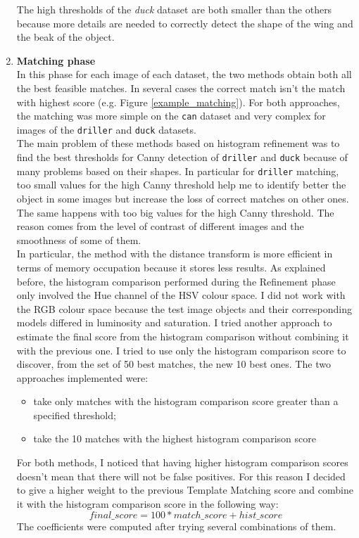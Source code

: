 \documentclass{article}
\begin{document}
\begin{enumerate}
{The high thresholds of the \textit{duck} dataset are both smaller than the others  because more details are needed to correctly detect the shape of the wing and the beak of the object.
}
\item{\textbf{Matching phase}\\
In this phase for each image of each dataset, the two methods obtain both all the best feasible matches. In several cases the correct match isn't the match with highest score (e.g. Figure \ref{example_matching}). For both approaches, the matching was more simple on the \texttt{can} dataset and very complex for images of the \texttt{driller} and \texttt{duck} datasets.\\
The main problem of these methods based on histogram refinement was to find the best thresholds for Canny detection of \texttt{driller} and \texttt{duck} because of many problems based on their shapes. In particular for \texttt{driller} matching, too small values for the high Canny threshold help me to identify better the object in some images but increase the loss of correct matches on other ones. The same happens with too big values for the high Canny threshold. The reason comes from the level of contrast of different images and the smoothness of some of them.\\
In particular, the method with the distance transform is more efficient in terms of memory occupation because it stores less results.
As explained before, the histogram comparison performed during the Refinement phase only involved the Hue channel of the HSV colour space. I did not work with the RGB colour space because the test image objects and their corresponding models differed in luminosity and saturation. I tried another approach to estimate the final score from the histogram comparison without combining it with the previous one. I tried to use only the histogram comparison score to discover, from the set of 50 best matches, the new 10 best ones. The two approaches implemented were: 
\begin{itemize}
\item{take only matches with the histogram comparison score greater than a specified threshold;}
\item{take the 10 matches with the highest histogram comparison score}
\end{itemize}
For both methods, I noticed that having higher histogram comparison scores doesn't mean that there will not be false positives. For this reason I decided to give a higher weight to the previous Template Matching score and combine it with the histogram comparison score in the following way:
$$final\_score=100*match\_score + hist\_score$$
The coefficients were computed after trying several combinations of them.}
\end{enumerate}
\end{document}
